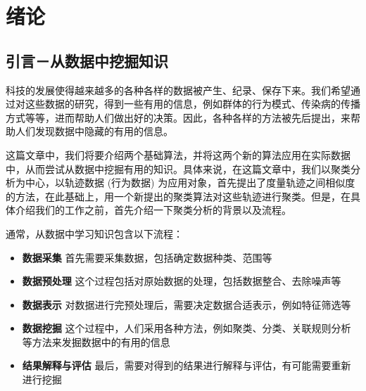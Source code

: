 
\chapter{绪论}

\section{引言－从数据中挖掘知识}
科技的发展使得越来越多的各种各样的数据被产生、纪录、保存下来。我们希望通过对这些数据的研究，得到一些有用的信息，例如群体的行为模式、传染病的传播方式等等，进而帮助人们做出好的决策。因此，各种各样的方法被先后提出，来帮助人们发现数据中隐藏的有用的信息。\par
这篇文章中，我们将要介绍两个基础算法，并将这两个新的算法应用在实际数据中，从而尝试从数据中挖掘有用的知识。具体来说，在这篇文章中，我们以聚类分析为中心，以轨迹数据 (行为数据) 为应用对象，首先提出了度量轨迹之间相似度的方法，在此基础上，用一个新提出的聚类算法对这些轨迹进行聚类。但是，在具体介绍我们的工作之前，首先介绍一下聚类分析的背景以及流程。\par
通常，从数据中学习知识包含以下流程：
\begin{itemize}
\item \hspace{2mm} \textbf{数据采集} 首先需要采集数据，包括确定数据种类、范围等
\item \hspace{2mm} \textbf{数据预处理} 这个过程包括对原始数据的处理，包括数据整合、去除噪声等
\item \hspace{2mm} \textbf{数据表示} 对数据进行完预处理后，需要决定数据合适表示，例如特征筛选等
\item \hspace{2mm} \textbf{数据挖掘} 这个过程中，人们采用各种方法，例如聚类、分类、关联规则分析等方法来发掘数据中的有用的信息
\item \hspace{2mm} \textbf{结果解释与评估} 最后，需要对得到的结果进行解释与评估，有可能需要重新进行挖掘
\end{itemize}

